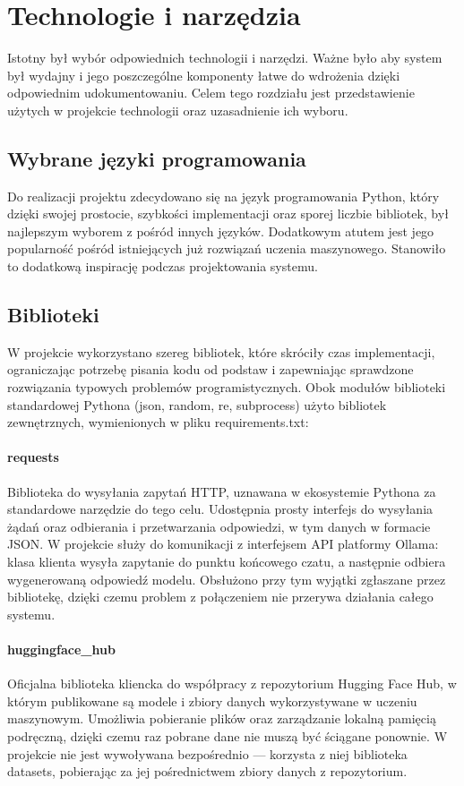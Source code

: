 \chapter{Technologie i narzędzia}

Istotny był wybór odpowiednich technologii i narzędzi. Ważne było aby system był wydajny i jego poszczególne komponenty łatwe do wdrożenia dzięki odpowiednim udokumentowaniu. Celem tego rozdziału jest przedstawienie użytych w projekcie technologii oraz uzasadnienie ich wyboru.

\section{Wybrane języki programowania}

Do realizacji projektu zdecydowano się na język programowania Python, który dzięki swojej prostocie, szybkości implementacji oraz sporej liczbie bibliotek, był najlepszym wyborem z pośród innych języków. Dodatkowym atutem jest jego popularność pośród istniejących już rozwiązań uczenia maszynowego. Stanowiło to dodatkową inspirację podczas projektowania systemu.

\section{Biblioteki}

W projekcie wykorzystano szereg bibliotek, które skróciły czas implementacji, ograniczając potrzebę pisania kodu od podstaw i zapewniając sprawdzone rozwiązania typowych problemów programistycznych. Obok modułów biblioteki standardowej Pythona (json, random, re, subprocess) użyto bibliotek zewnętrznych, wymienionych w pliku requirements.txt:

\subsubsection{requests}
Biblioteka do wysyłania zapytań HTTP, uznawana w ekosystemie Pythona za standardowe narzędzie do tego celu. Udostępnia prosty interfejs do wysyłania żądań oraz odbierania i przetwarzania odpowiedzi, w tym danych w formacie JSON. W projekcie służy do komunikacji z interfejsem API platformy Ollama: klasa klienta wysyła zapytanie do punktu końcowego czatu, a następnie odbiera wygenerowaną odpowiedź modelu. Obsłużono przy tym wyjątki zgłaszane przez bibliotekę, dzięki czemu problem z połączeniem nie przerywa działania całego systemu.

\subsubsection{huggingface\_hub}
Oficjalna biblioteka kliencka do współpracy z repozytorium Hugging Face Hub, w którym publikowane są modele i zbiory danych wykorzystywane w uczeniu maszynowym. Umożliwia pobieranie plików oraz zarządzanie lokalną pamięcią podręczną, dzięki czemu raz pobrane dane nie muszą być ściągane ponownie. W projekcie nie jest wywoływana bezpośrednio — korzysta z niej biblioteka datasets, pobierając za jej pośrednictwem zbiory danych z repozytorium.

